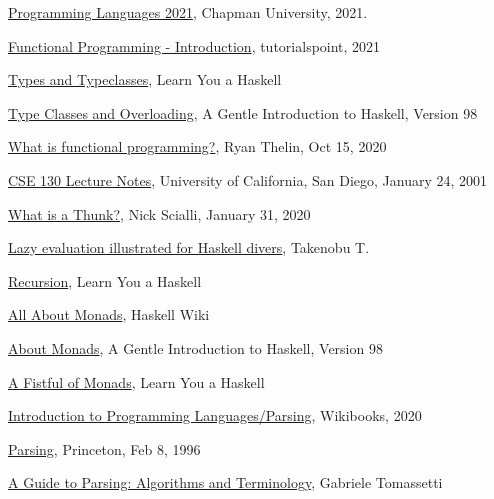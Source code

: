 \documentclass{article}
\begin{document}
\begin{thebibliography}{99}
 \href{https://github.com/alexhkurz/programming-languages-2021/blob/main/README.md}{Programming Languages 2021}, Chapman University, 2021.

 \href{https://www.tutorialspoint.com/functional_programming/functional_programming_introduction.htm}{Functional Programming - Introduction}, tutorialspoint, 2021

 \href{http://learnyouahaskell.com/types-and-typeclasses}{Types and Typeclasses}, Learn You a Haskell

 \href{https://www.haskell.org/tutorial/classes.html}{Type Classes and Overloading}, A Gentle Introduction to Haskell, Version 98

 \href{https://www.educative.io/blog/what-is-functional-programming-python-js-java}{What is functional programming?}, Ryan Thelin, Oct 15, 2020

 \href{http://users.sdsc.edu/~ludaesch/CSE130/ln5.html}{CSE 130 Lecture Notes}, University of California, San Diego, January 24, 2001

 \href{https://typeofnan.dev/what-is-a-thunk/}{What is a Thunk?}, Nick Scialli, January 31, 2020

 \href{https://takenobu-hs.github.io/downloads/haskell_lazy_evaluation.pdf}{Lazy evaluation illustrated for Haskell divers}, Takenobu T.

 \href{http://learnyouahaskell.com/recursion}{Recursion}, Learn You a Haskell

 \href{https://wiki.haskell.org/All_About_Monads}{All About Monads}, Haskell Wiki 

 \href{https://www.haskell.org/tutorial/monads.html}{About Monads}, A Gentle Introduction to Haskell, Version 98

 \href{http://learnyouahaskell.com/a-fistful-of-monads}{A Fistful of Monads}, Learn You a Haskell

 \href{https://en.wikibooks.org/wiki/Introduction_to_Programming_Languages/Parsing}{Introduction to Programming Languages/Parsing}, Wikibooks, 2020

 \href{https://www.cs.princeton.edu/courses/archive/spr96/cs441/notes/l2.html}{Parsing}, Princeton, Feb 8, 1996

 \href{https://tomassetti.me/guide-parsing-algorithms-terminology/} {A Guide to Parsing: Algorithms and Terminology}, Gabriele Tomassetti


\end{thebibliography}
\end{document}
